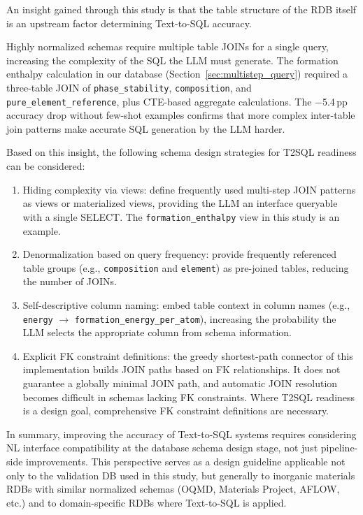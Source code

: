 An insight gained through this study is that the table structure of the RDB itself is an upstream factor determining Text-to-SQL accuracy.

Highly normalized schemas require multiple table JOINs for a single query, increasing the complexity of the SQL the LLM must generate. The formation enthalpy calculation in our database (Section~\ref{sec:multistep_query}) required a three-table JOIN of \texttt{phase\_stability}, \texttt{composition}, and \texttt{pure\_element\_reference}, plus CTE-based aggregate calculations. The $-$5.4\,pp accuracy drop without few-shot examples confirms that more complex inter-table join patterns make accurate SQL generation by the LLM harder.

Based on this insight, the following schema design strategies for T2SQL readiness can be considered:
\begin{enumerate}
  \item Hiding complexity via views:
    define frequently used multi-step JOIN patterns as views or materialized views, providing the LLM an interface queryable with a single SELECT. The \texttt{formation\_enthalpy} view in this study is an example.
  \item Denormalization based on query frequency:
    provide frequently referenced table groups (e.g., \texttt{composition} and \texttt{element}) as pre-joined tables, reducing the number of JOINs.
  \item Self-descriptive column naming:
    embed table context in column names (e.g., \texttt{energy} $\to$ \texttt{formation\_energy\_per\_atom}), increasing the probability the LLM selects the appropriate column from schema information.
  \item Explicit FK constraint definitions:
    the greedy shortest-path connector of this implementation builds JOIN paths based on FK relationships. It does not guarantee a globally minimal JOIN path, and automatic JOIN resolution becomes difficult in schemas lacking FK constraints. Where T2SQL readiness is a design goal, comprehensive FK constraint definitions are necessary.
\end{enumerate}

In summary, improving the accuracy of Text-to-SQL systems requires considering NL interface compatibility at the database schema design stage, not just pipeline-side improvements. This perspective serves as a design guideline applicable not only to the validation DB used in this study, but generally to inorganic materials RDBs with similar normalized schemas (OQMD, Materials Project, AFLOW, etc.) and to domain-specific RDBs where Text-to-SQL is applied.
